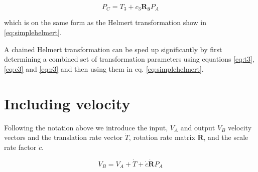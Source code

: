 \documentclass[11pt,twocolumn]{article}
\newcommand{\matr}[1]{\mathbf{#1}}
\begin{document}
\begin{equation}
    P_C = T_3 + c_3 \matr{R_3} P_A
\end{equation}

which is on the same form as the Helmert transformation show in
\ref{eq:simplehelmert}.

A chained Helmert transformation can be sped up significantly by first
determining a combined set of transformation parameters using equations
\ref{eq:t3}, \ref{eq:c3} and \ref{eq:r3} and then using them in eq.
\ref{eq:simplehelmert}.

\section{Including velocity}
Following the notation above we introduce the input, $V_A$ and output $V_B$ velocity vectors and the translation rate vector $\dot{T}$, rotation rate matrix $\dot{\matr{R}}$, and the scale rate factor $\dot{c}$.


\begin{equation}
	V_B = V_A + \dot{T} + \dot{c} \dot{\matr{R}} P_A
\end{equation}
\end{document}

